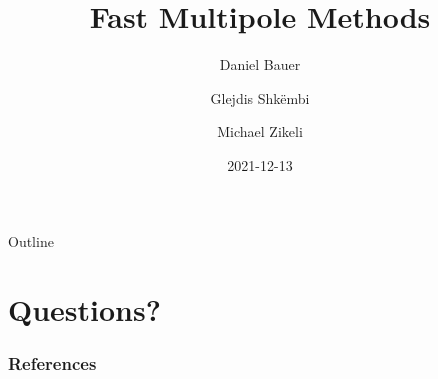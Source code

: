 \documentclass[english,c,professionalfonts]{beamer}
\title{Fast Multipole Methods}
\author{Daniel Bauer \and Glejdis Shkëmbi \and Michael Zikeli}
\date{2021-12-13}
\institute[FAU \and USI]{Friedrich-Alexander-Universität Erlangen-Nürnberg \and Università della Svizzera italiana}
\begin{document}
  \frame[plain,c]{\titlepage}

  

  \begin{frame}{Outline}
    \tableofcontents
  \end{frame}

  
%  
  

  \section*{Questions?}

  \begin{frame}[fragile,c]
  \frametitle{References}
    \nocite{*}
    \printbibliography[heading=none]
  \end{frame}
\end{document}
